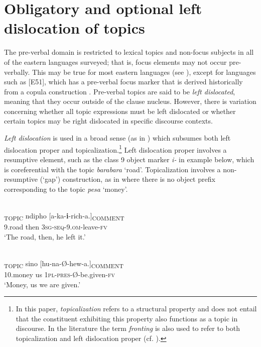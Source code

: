 \documentclass[output=paper]{langsci/langscibook}
\begin{document}
\section{Obligatory and optional left dislocation of topics}\label{§3:obligatory.nicolle}

The pre-verbal domain is restricted to lexical topics and non-focus subjects in all of the eastern  languages surveyed; that is, focus elements may not occur pre-verbally. This may be true for most eastern  languages (see \citealt{zerbian2006,vanderwal2009,yoneda2011}), except for languages such as  [E51], which has a pre-verbal focus marker that is derived historically from a copula construction \citep{schwarz2003kikuyu,schwarz2007kikuyu,vanderwal2014}. Pre-verbal topics are said to be \textit{left dislocated}, meaning that they occur outside of the clause nucleus. However, there is variation concerning whether all topic expressions must be left dislocated or whether certain topics may be right dislocated in specific discourse contexts.

\textit{Left dislocation} is used in a broad sense (as in \citealt{shaeretal2009}) which subsumes both left dislocation proper and topicalization.\footnote{In this paper, \textit{topicalizat}\textit{ion} refers to a structural property and does not entail that the constituent exhibiting this property also functions as a topic in discourse. In the literature the term \textit{fronting} is also used to refer to both topicalization and left dislocation proper (cf. \citealt[313]{cohen2009}).} Left dislocation proper involves a resumptive element, such as the class 9 object marker \textit{i}\textit{-} in example  below, which is coreferential with the topic \textit{barabara} ‘road’. Topicalization involves a non-resumptive (‘gap’) construction, as in  where there is no object prefix corresponding to the topic \textit{pesa} ‘money’.

\ea\label{ex:2.nicolle}
\\
\gll [Barabara]\textsubscript{TOPIC} ndipho [a-ka-\textbf{i}-rich-a.]\textsubscript{COMMENT}\\
     {\db}9.road then {\db}\textsc{3sg-seq}-9.\textsc{om}-leave-\textsc{fv}\\
\glt ‘The road, then, he left it.’
\z

\ea\label{ex:3.nicolle}
\\
\gll [Pesa]\textsubscript{TOPIC} sino [hu-na-Ø-hew-a.]\textsubscript{COMMENT}\\
{\db}10.money us {\db}\textsc{1pl-pres}-Ø-be.given-\textsc{fv}\\
\glt ‘Money, us we are given.’
\z
\end{document}
